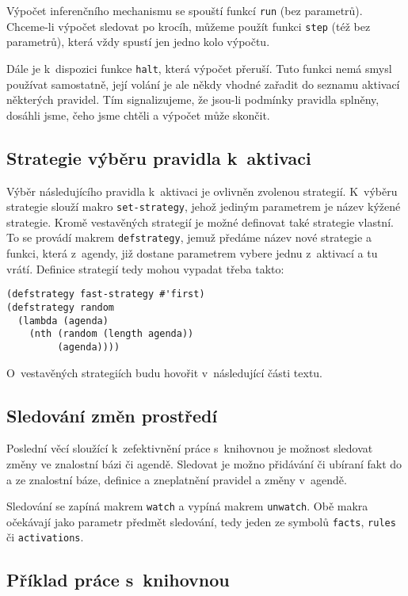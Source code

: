 Výpočet inferenčního mechanismu se spouští funkcí \verb|run| (bez parametrů).
Chceme-li výpočet sledovat po krocíh, můžeme použít funkci \verb|step| (též bez
parametrů), která vždy spustí jen jedno kolo výpočtu.

Dále je k~dispozici funkce \verb|halt|, která výpočet přeruší. Tuto funkci nemá
smysl používat samostatně, její volání je ale někdy vhodné zařadit do seznamu
aktivací některých pravidel. Tím signalizujeme, že jsou-li podmínky pravidla
splněny, dosáhli jsme, čeho jsme chtěli a výpočet může skončit.

\subsection{Strategie výběru pravidla k~aktivaci}
Výběr následujícího pravidla k~aktivaci je ovlivněn zvolenou strategií.
K~výběru strategie slouží makro \verb|set-strategy|, jehož jediným parametrem je
název kýžené strategie.
Kromě vestavěných strategií je možné definovat také strategie vlastní. To se
provádí makrem \verb|defstrategy|, jemuž předáme název nové strategie a
funkci, která z~agendy, již dostane parametrem vybere jednu z~aktivací a tu
vrátí. Definice strategií tedy mohou vypadat třeba takto:
\begin{verbatim}
(defstrategy fast-strategy #'first)
(defstrategy random
  (lambda (agenda)
    (nth (random (length agenda))
         (agenda))))
\end{verbatim}
O~vestavěných strategiích budu hovořit v~následující části textu.
\subsection{Sledování změn prostředí}
\label{watchers}
Poslední věcí sloužící k~zefektivnění práce s~knihovnou je možnost sledovat
změny ve znalostní bázi či agendě. Sledovat je možno přidávání či ubíraní fakt
do a ze znalostní báze, definice a zneplatnění pravidel a změny v~agendě.

Sledování se zapíná makrem \verb|watch| a vypíná makrem \verb|unwatch|. Obě
makra očekávají jako parametr předmět sledování, tedy jeden ze symbolů
\verb|facts|, \verb|rules| či \verb|activations|.
\subsection{Příklad práce s~knihovnou}

